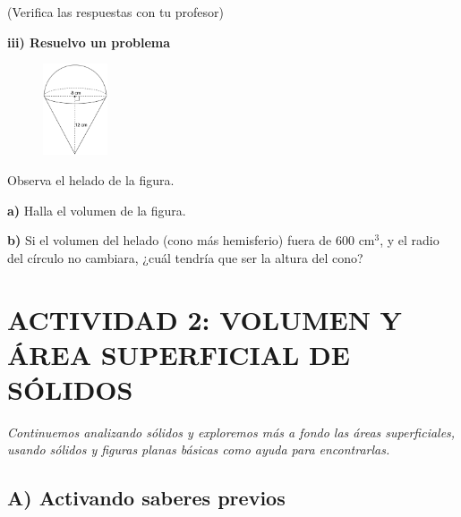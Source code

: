 \documentclass[12pt,a4paper]{article}
\begin{document}
(Verifica las respuestas con tu profesor)

\vspace{4mm}


\textbf{iii) Resuelvo un problema}

\begin{figure}
\centering
\vspace{-20pt}
\includegraphics[width=0.17\textwidth]{Figuras/fig53.png}
\vspace{-15pt}
\end{figure}

Observa el helado de la figura.

\textbf{a)} Halla el volumen de la figura.

\textbf{b)} Si el volumen del helado (cono más hemisferio) fuera de 600 cm$^3$, y el radio del círculo no cambiara, ¿cuál tendría que ser la altura del cono?

\vspace{6mm}


\section*{ACTIVIDAD 2: VOLUMEN Y ÁREA SUPERFICIAL DE SÓLIDOS}

\textit{Continuemos analizando sólidos y exploremos más a fondo las áreas superficiales, usando sólidos y figuras planas básicas como ayuda para encontrarlas.}

\subsection*{A) Activando saberes previos}
\end{document}
